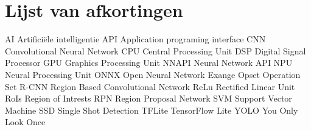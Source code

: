 \chapter*{Lijst van afkortingen}
AI      Artifici\"ele intelligentie \newline
API     Application programing interface \newline
CNN     Convolutional Neural Network \newline
CPU     Central Processing Unit \newline
DSP     Digital Signal Processor \newline
GPU     Graphics Processing Unit \newline
NNAPI   Neural Network API \newline
NPU     Neural Processing Unit \newline
ONNX    Open Neural Network Exange \newline
Opset   Operation Set \newline
R-CNN   Region Based Convolutional Network \newline
ReLu    Rectified Linear Unit \newline
RoIs    Region of Intrests \newline
RPN     Region Proposal Network \newline
SVM     Support Vector Machine \newline
SSD     Single Shot Detection \newline
TFLite  TensorFlow Lite \newline
YOLO    You Only Look Once \newline